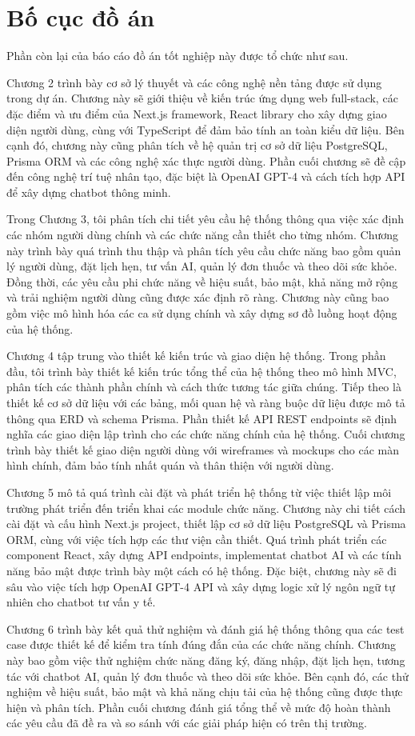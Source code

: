 \documentclass[../DoAn.tex]{subfiles}
\begin{document}
\section{Bố cục đồ án}
\label{section:1.4}

Phần còn lại của báo cáo đồ án tốt nghiệp này được tổ chức như sau.

Chương 2 trình bày cơ sở lý thuyết và các công nghệ nền tảng được sử dụng trong dự án. Chương này sẽ giới thiệu về kiến trúc ứng dụng web full-stack, các đặc điểm và ưu điểm của Next.js framework, React library cho xây dựng giao diện người dùng, cùng với TypeScript để đảm bảo tính an toàn kiểu dữ liệu. Bên cạnh đó, chương này cũng phân tích về hệ quản trị cơ sở dữ liệu PostgreSQL, Prisma ORM và các công nghệ xác thực người dùng. Phần cuối chương sẽ đề cập đến công nghệ trí tuệ nhân tạo, đặc biệt là OpenAI GPT-4 và cách tích hợp API để xây dựng chatbot thông minh.

Trong Chương 3, tôi phân tích chi tiết yêu cầu hệ thống thông qua việc xác định các nhóm người dùng chính và các chức năng cần thiết cho từng nhóm. Chương này trình bày quá trình thu thập và phân tích yêu cầu chức năng bao gồm quản lý người dùng, đặt lịch hẹn, tư vấn AI, quản lý đơn thuốc và theo dõi sức khỏe. Đồng thời, các yêu cầu phi chức năng về hiệu suất, bảo mật, khả năng mở rộng và trải nghiệm người dùng cũng được xác định rõ ràng. Chương này cũng bao gồm việc mô hình hóa các ca sử dụng chính và xây dựng sơ đồ luồng hoạt động của hệ thống.

Chương 4 tập trung vào thiết kế kiến trúc và giao diện hệ thống. Trong phần đầu, tôi trình bày thiết kế kiến trúc tổng thể của hệ thống theo mô hình MVC, phân tích các thành phần chính và cách thức tương tác giữa chúng. Tiếp theo là thiết kế cơ sở dữ liệu với các bảng, mối quan hệ và ràng buộc dữ liệu được mô tả thông qua ERD và schema Prisma. Phần thiết kế API REST endpoints sẽ định nghĩa các giao diện lập trình cho các chức năng chính của hệ thống. Cuối chương trình bày thiết kế giao diện người dùng với wireframes và mockups cho các màn hình chính, đảm bảo tính nhất quán và thân thiện với người dùng.

Chương 5 mô tả quá trình cài đặt và phát triển hệ thống từ việc thiết lập môi trường phát triển đến triển khai các module chức năng. Chương này chi tiết cách cài đặt và cấu hình Next.js project, thiết lập cơ sở dữ liệu PostgreSQL và Prisma ORM, cùng với việc tích hợp các thư viện cần thiết. Quá trình phát triển các component React, xây dựng API endpoints, implementat chatbot AI và các tính năng bảo mật được trình bày một cách có hệ thống. Đặc biệt, chương này sẽ đi sâu vào việc tích hợp OpenAI GPT-4 API và xây dựng logic xử lý ngôn ngữ tự nhiên cho chatbot tư vấn y tế.

Chương 6 trình bày kết quả thử nghiệm và đánh giá hệ thống thông qua các test case được thiết kế để kiểm tra tính đúng đắn của các chức năng chính. Chương này bao gồm việc thử nghiệm chức năng đăng ký, đăng nhập, đặt lịch hẹn, tương tác với chatbot AI, quản lý đơn thuốc và theo dõi sức khỏe. Bên cạnh đó, các thử nghiệm về hiệu suất, bảo mật và khả năng chịu tải của hệ thống cũng được thực hiện và phân tích. Phần cuối chương đánh giá tổng thể về mức độ hoàn thành các yêu cầu đã đề ra và so sánh với các giải pháp hiện có trên thị trường.
\end{document}
